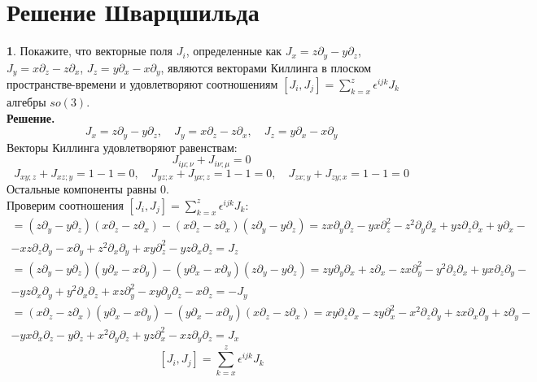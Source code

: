 \documentclass[12pt]{article}
\theoremstyle{definition}
\newtheorem{zad}{}[section]
\begin{document}
\section{Решение Шварцшильда}
\begin{zad}
Покажите, что векторные поля $J_i$, определенные как $J_x=z\partial_y-y\partial_z$, $J_y=x\partial_z-z\partial_x$, $J_z=y\partial_x-x\partial_y$, являются векторами Киллинга в плоском пространстве-времени и удовлетворяют соотношениям $[J_i,J_j]=\sum\limits_{k=x}^z\epsilon^{ijk}J_k$ алгебры $so(3)$.\\
\textbf{Решение.}
\begin{equation}
    J_x=z\partial_y-y\partial_z,\quad J_y=x\partial_z-z\partial_x,\quad J_z=y\partial_x-x\partial_y
\end{equation}
Векторы Киллинга удовлетворяют равенствам:
\begin{equation}
    J_{i\mu;\nu}+J_{i\nu;\mu}=0
\end{equation}
\begin{equation}
    J_{xy;z}+J_{xz;y}=1-1=0,\quad J_{yz;x}+J_{yx;z}=1-1=0,\quad J_{zx;y}+J_{zy;x}=1-1=0
\end{equation}
Остальные компоненты равны 0.\\
Проверим соотношения $[J_i,J_j]=\sum\limits_{k=x}^z\epsilon^{ijk}J_k$:
\begin{multline}
    [J_x,J_y]=(z\partial_y-y\partial_z)(x\partial_z-z\partial_x)-(x\partial_z-z\partial_x)(z\partial_y-y\partial_z)=zx\partial_y\partial_z-yx\partial^2_z-z^2\partial_y\partial_x+yz\partial_z\partial_x+y\partial_x-\\-xz\partial_z\partial_y-x\partial_y+z^2\partial_x\partial_y+xy\partial^2_z-yz\partial_x\partial_z=J_z
\end{multline}
\begin{multline}
    [J_x,J_z]=(z\partial_y-y\partial_z)(y\partial_x-x\partial_y)-(y\partial_x-x\partial_y)(z\partial_y-y\partial_z)=zy\partial_y\partial_x+z\partial_x-zx\partial^2_y-y^2\partial_z\partial_x+yx\partial_z\partial_y-\\-yz\partial_x\partial_y+y^2\partial_x\partial_z+xz\partial^2_y-xy\partial_y\partial_z-x\partial_z=-J_y
\end{multline}
\begin{multline}
    [J_y,J_z]=(x\partial_z-z\partial_x)(y\partial_x-x\partial_y)-(y\partial_x-x\partial_y)(x\partial_z-z\partial_x)=xy\partial_z\partial_x-zy\partial^2_x-x^2\partial_z\partial_y+zx\partial_x\partial_y+z\partial_y-\\-yx\partial_x\partial_z-y\partial_z+x^2\partial_y\partial_z+yz\partial^2_x-xz\partial_y\partial_z=J_x
\end{multline}
\begin{equation}
    \boxed{[J_i,J_j]=\sum\limits_{k=x}^z\epsilon^{ijk}J_k}
\end{equation}
\end{zad}
\end{document}
